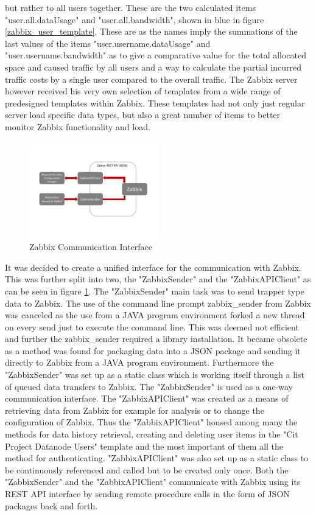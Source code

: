 but rather to all users together. These are the two calculated items "user.all.dataUsage" and "user.all.bandwidth", shown in blue in figure \ref{zabbix_user_template}. These are as the names imply the summations of the last values of the items "user.username.dataUsage" and "user.username.bandwidth" as to give a comparative value for the total allocated space and caused traffic by all users and a  way to calculate the partial incurred traffic costs by a single user compared to the overall traffic.
	The Zabbix server however received his very own selection of templates from a wide range of predesigned templates within Zabbix. These templates had not only just regular server load specific data types, but also a great number of items to better monitor Zabbix functionality and load.
\begin{figure}[ht]
\centering
\includegraphics[width=0.5\textwidth]{img/ZabbixApiSender} 

\caption{Zabbix Communication Interface}
\label{zabbix_api_sender}
\end{figure}
	It was decided to create a unified interface for the communication with Zabbix. This was further split into two, the "ZabbixSender" and the "ZabbixAPIClient" as can be seen in figure \ref{zabbix_api_sender}. The "ZabbixSender" main task was to send trapper type data to Zabbix. The use of the command line prompt zabbix\_sender from Zabbix was canceled as the use from a JAVA program environment forked a new thread on every send just to execute the command line. This was deemed not efficient and further the zabbix\_sender required a library installation. It became obsolete as a method was found for packaging data into a JSON package and sending it directly to Zabbix from a JAVA program environment. Furthermore the "ZabbixSender" was set up as a static class which is working itself through a list of queued data transfers to Zabbix. The "ZabbixSender" is used as a one-way communication interface. The "ZabbixAPIClient" was created as a means of retrieving data from Zabbix for example for analysis or to change the configuration of Zabbix. Thus the "ZabbixAPIClient" housed among many the methods for data history retrieval, creating and deleting user items in the "Cit Project Datanode Users" template and the most important of them all the method for authenticating. "ZabbixAPIClient" was also set up as a static class to be continuously referenced and called but to be created only once. Both the "ZabbixSender" and the "ZabbixAPIClient" communicate with Zabbix using its REST API interface by sending remote procedure calls in the form of JSON packages back and forth.
